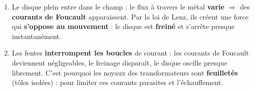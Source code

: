 \documentclass[11pt,a4paper]{article}
\begin{document}
\begin{corrige}
\begin{enumerate}[label=\alph*)]
  \item Le disque plein entre dans le champ : le flux à travers le métal \textbf{varie} $\Rightarrow$
        des \textbf{courants de Foucault} apparaissent. Par la loi de Lenz, ils créent une force qui
        \textbf{s'oppose au mouvement} : le disque est \textbf{freiné} et s'arrête presque
        instantanément.
  \item Les fentes \textbf{interrompent les boucles} de courant : les courants de Foucault deviennent
        négligeables, le freinage disparaît, le disque oscille presque librement. C'est pourquoi les
        noyaux des transformateurs sont \textbf{feuilletés} (tôles isolées) : pour limiter ces courants
        parasites et l'échauffement.
\end{enumerate}
\end{corrige}
\end{document}
